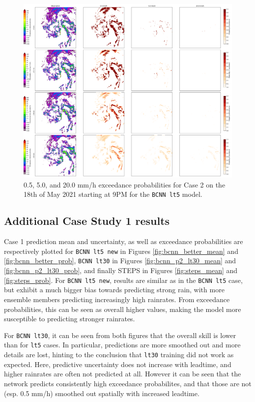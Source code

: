 \begin{figure}[ht]
	\centering
	\includegraphics[width=\textwidth]{images/cases/bcnn_prob_case2}
	\caption{0.5, 5.0, and 20.0 mm/h exceedance probabilities for Case 2 on the 18th of May 2021 starting at 9PM for the \texttt{BCNN lt5} model.}
	\label{fig:bcnn_prob_case2}
\end{figure}

\subsection{Additional Case Study 1 results}

Case 1 prediction mean and uncertainty, as well as exceedance probabilities are respectively plotted for \texttt{BCNN lt5 new} in Figures \ref{fig:bcnn_better_mean} and \ref{fig:bcnn_better_prob}, \texttt{BCNN lt30} in Figures \ref{fig:bcnn_p2_lt30_mean} and \ref{fig:bcnn_p2_lt30_prob}, and finally STEPS in Figures \ref{fig:steps_mean} and \ref{fig:steps_prob}. For \texttt{BCNN lt5 new}, results are similar as in the \texttt{BCNN lt5} case, but exhibit a much bigger bias towards predicting strong rain, with more ensemble members predicting increasingly high rainrates. From exceedance probabilities, this can be seen as overall higher values, making the model more susceptible to predicting stronger rainrates. 

For \texttt{BCNN lt30}, it can be seen from both figures that the overall skill is lower than for \texttt{lt5} cases. In particular, predictions are more smoothed out and more details are lost, hinting to the conclusion that \texttt{lt30} training did not work as expected. Here, predictive uncertainty does not increase with leadtime, and higher rainrates are often not predicted at all. However it can be seen that the network predicts consistently high exceedance probabilites, and that those are not (esp. 0.5 mm/h) smoothed out spatially with increased leadtime. 

